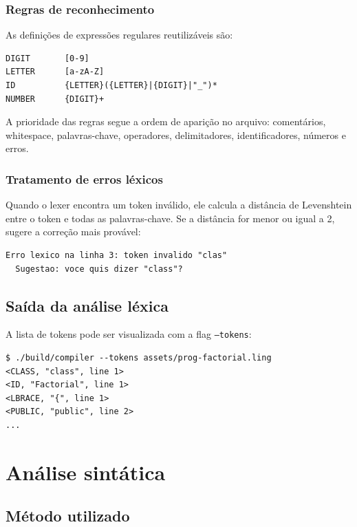 \documentclass[a4paper, 12pt]{article}
\begin{document}
\subsubsection{Regras de reconhecimento}

As defini\c{c}\~oes de express\~oes regulares reutiliz\'aveis s\~ao:

\begin{lstlisting}[numbers=none]
DIGIT       [0-9]
LETTER      [a-zA-Z]
ID          {LETTER}({LETTER}|{DIGIT}|"_")*
NUMBER      {DIGIT}+
\end{lstlisting}

A prioridade das regras segue a ordem de apari\c{c}\~ao no arquivo: coment\'arios, whitespace, palavras-chave, operadores, delimitadores, identificadores, n\'umeros e erros.

\subsubsection{Tratamento de erros l\'exicos}

Quando o lexer encontra um token inv\'alido, ele calcula a dist\^ancia de Levenshtein entre o token e todas as palavras-chave. Se a dist\^ancia for menor ou igual a 2, sugere a corre\c{c}\~ao mais prov\'avel:

\begin{lstlisting}[numbers=none]
Erro lexico na linha 3: token invalido "clas"
  Sugestao: voce quis dizer "class"?
\end{lstlisting}

\subsection{Sa\'ida da an\'alise l\'exica}

A lista de tokens pode ser visualizada com a flag \texttt{--tokens}:

\begin{lstlisting}[numbers=none]
$ ./build/compiler --tokens assets/prog-factorial.ling
<CLASS, "class", line 1>
<ID, "Factorial", line 1>
<LBRACE, "{", line 1>
<PUBLIC, "public", line 2>
...
\end{lstlisting}

\section{An\'alise sint\'atica}

\subsection{M\'etodo utilizado}
\end{document}
